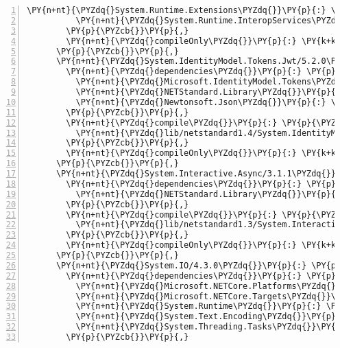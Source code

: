 \begin{Verbatim}[commandchars=\\\{\},numbers=left,firstnumber=1,stepnumber=1,numberblanklines=0]
          \PY{n+nt}{\PYZdq{}System.Runtime.Extensions\PYZdq{}}\PY{p}{:} \PY{l+s+s2}{\PYZdq{}4.3.0\PYZdq{}}\PY{p}{,}
          \PY{n+nt}{\PYZdq{}System.Runtime.InteropServices\PYZdq{}}\PY{p}{:} \PY{l+s+s2}{\PYZdq{}4.3.0\PYZdq{}}
        \PY{p}{\PYZcb{}}\PY{p}{,}
        \PY{n+nt}{\PYZdq{}compileOnly\PYZdq{}}\PY{p}{:} \PY{k+kc}{true}
      \PY{p}{\PYZcb{}}\PY{p}{,}
      \PY{n+nt}{\PYZdq{}System.IdentityModel.Tokens.Jwt/5.2.0\PYZdq{}}\PY{p}{:} \PY{p}{\PYZob{}}
        \PY{n+nt}{\PYZdq{}dependencies\PYZdq{}}\PY{p}{:} \PY{p}{\PYZob{}}
          \PY{n+nt}{\PYZdq{}Microsoft.IdentityModel.Tokens\PYZdq{}}\PY{p}{:} \PY{l+s+s2}{\PYZdq{}5.2.0\PYZdq{}}\PY{p}{,}
          \PY{n+nt}{\PYZdq{}NETStandard.Library\PYZdq{}}\PY{p}{:} \PY{l+s+s2}{\PYZdq{}2.0.3\PYZdq{}}\PY{p}{,}
          \PY{n+nt}{\PYZdq{}Newtonsoft.Json\PYZdq{}}\PY{p}{:} \PY{l+s+s2}{\PYZdq{}11.0.2\PYZdq{}}
        \PY{p}{\PYZcb{}}\PY{p}{,}
        \PY{n+nt}{\PYZdq{}compile\PYZdq{}}\PY{p}{:} \PY{p}{\PYZob{}}
          \PY{n+nt}{\PYZdq{}lib/netstandard1.4/System.IdentityModel.Tokens.Jwt.dll\PYZdq{}}\PY{p}{:} \PY{p}{\PYZob{}}\PY{p}{\PYZcb{}}
        \PY{p}{\PYZcb{}}\PY{p}{,}
        \PY{n+nt}{\PYZdq{}compileOnly\PYZdq{}}\PY{p}{:} \PY{k+kc}{true}
      \PY{p}{\PYZcb{}}\PY{p}{,}
      \PY{n+nt}{\PYZdq{}System.Interactive.Async/3.1.1\PYZdq{}}\PY{p}{:} \PY{p}{\PYZob{}}
        \PY{n+nt}{\PYZdq{}dependencies\PYZdq{}}\PY{p}{:} \PY{p}{\PYZob{}}
          \PY{n+nt}{\PYZdq{}NETStandard.Library\PYZdq{}}\PY{p}{:} \PY{l+s+s2}{\PYZdq{}2.0.3\PYZdq{}}
        \PY{p}{\PYZcb{}}\PY{p}{,}
        \PY{n+nt}{\PYZdq{}compile\PYZdq{}}\PY{p}{:} \PY{p}{\PYZob{}}
          \PY{n+nt}{\PYZdq{}lib/netstandard1.3/System.Interactive.Async.dll\PYZdq{}}\PY{p}{:} \PY{p}{\PYZob{}}\PY{p}{\PYZcb{}}
        \PY{p}{\PYZcb{}}\PY{p}{,}
        \PY{n+nt}{\PYZdq{}compileOnly\PYZdq{}}\PY{p}{:} \PY{k+kc}{true}
      \PY{p}{\PYZcb{}}\PY{p}{,}
      \PY{n+nt}{\PYZdq{}System.IO/4.3.0\PYZdq{}}\PY{p}{:} \PY{p}{\PYZob{}}
        \PY{n+nt}{\PYZdq{}dependencies\PYZdq{}}\PY{p}{:} \PY{p}{\PYZob{}}
          \PY{n+nt}{\PYZdq{}Microsoft.NETCore.Platforms\PYZdq{}}\PY{p}{:} \PY{l+s+s2}{\PYZdq{}2.1.0\PYZhy{}rc1\PYZdq{}}\PY{p}{,}
          \PY{n+nt}{\PYZdq{}Microsoft.NETCore.Targets\PYZdq{}}\PY{p}{:} \PY{l+s+s2}{\PYZdq{}2.1.0\PYZhy{}rc1\PYZdq{}}\PY{p}{,}
          \PY{n+nt}{\PYZdq{}System.Runtime\PYZdq{}}\PY{p}{:} \PY{l+s+s2}{\PYZdq{}4.3.0\PYZdq{}}\PY{p}{,}
          \PY{n+nt}{\PYZdq{}System.Text.Encoding\PYZdq{}}\PY{p}{:} \PY{l+s+s2}{\PYZdq{}4.3.0\PYZdq{}}\PY{p}{,}
          \PY{n+nt}{\PYZdq{}System.Threading.Tasks\PYZdq{}}\PY{p}{:} \PY{l+s+s2}{\PYZdq{}4.3.0\PYZdq{}}
        \PY{p}{\PYZcb{}}\PY{p}{,}

\end{Verbatim}
